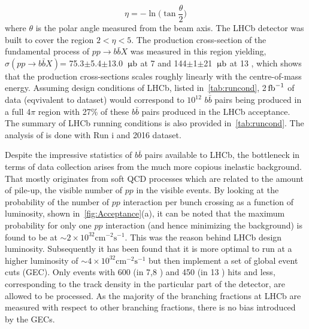 \begin{equation}
	\eta = -\ln \Big(\tan\frac{\theta}{2}\Big)
\end{equation}	
where $\theta$ is the polar angle measured from the beam axis. The \Gls{LHCb} detector was built to cover the region $2<\eta<5$. The production cross-section of the fundamental process of $pp\rightarrow b\bar{b}X$ was measured in this region yielding, $\sigma (pp\rightarrow b\bar{b}X)$= 75.3$\pm$5.4$\pm$13.0 ${\rm \,\upmu b}$ at 7 \tev \cite{LHCb-PAPER-2010-002} and 144$\pm$1$\pm$21 ${\rm \,\upmu b}$ at 13 \tev \cite{LHCb-PAPER-2016-031}, which shows that the production cross-sections scales roughly linearly with the centre-of-mass energy. Assuming \DIFaddbegin {}\DIFaddend design conditions of \gls{LHCb}, listed in~\autoref{tab:runcond}, 2$\mbox{\,fb}^{-1}$ of data (eqvivalent to \DIFaddbegin {} dataset) would correspond to $10^{12}$ \DIFdelbegin {}\DIFdelend $b\bar{b}$ pairs being produced in a full 4$\pi$ region with 27\% of these $b\bar{b}$ pairs produced in the \gls{LHCb} acceptance. The summary of \gls{LHCb} running conditions is also provided in~\autoref{tab:runcond}. The analysis of \Bmumumu is done with \DIFaddbegin {}\DIFaddend Run \Rn{1} and 2016 dataset. 

Despite the impressive statistics of $b\bar{b}$ pairs available to \Gls{LHCb}, the bottleneck in terms of data collection arises from the much more copious inelastic background. That mostly originates from soft \gls{QCD} processes which are related to the amount of pile-up, the visible number of $pp$ \DIFdelbegin {}\DIFdelend \DIFaddbegin {}\DIFaddend in the visible events. By looking at the probability of the number of $pp$ interaction per bunch crossing as a function of luminosity, shown in~\autoref{fig:Acceptance}(a), it can be noted that the maximum probability for only one $pp$ interaction (and hence minimizing the background) is found to be at $\sim 2 \times10^{32} \mathrm{cm^{-2} s^{-1}}$.  This was the reason behind \DIFaddbegin {}\DIFaddend \gls{LHCb} design luminosity. Subsequently it has been found that it is more optimal to run at a higher luminosity of $\sim 4 \times10^{32} \mathrm{cm^{-2} s^{-1}}$ but then implement a set of global event cuts (GEC). Only events with 600 (in 7,8 \tev) and 450 (in 13 \tev) hits and less, corresponding to the track density in the particular part of the detector, are allowed to be processed.
As the majority of the branching fractions at \gls{LHCb} are measured with respect to other branching fractions, there is no bias \DIFdelbegin {}\DIFdelend introduced by the GECs. 

